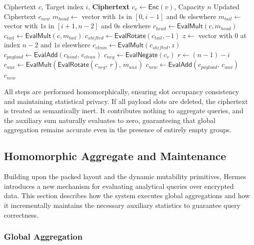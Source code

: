\documentclass[sigconf,nonacm]{acmart}
\begin{document}
\begin{algorithm}[t]
\caption{Homomorphic Deletion}
\label{alg:deletion}

\begin{algorithmic}[1]
\Require Ciphertext $c$, Target index $i$, \textbf{Ciphertext} $c_v \leftarrow \mathsf{Enc}(v)$, Capacity $n$
\Ensure Updated Ciphertext $c_{new}$
\State $m_{head} \leftarrow$ vector with $1$s in $[0, i-1]$ and $0$s elsewhere
\State $m_{tail} \leftarrow$ vector with $1$s in $[i+1, n-2]$ and $0$s elsewhere
\State $c_{head} \leftarrow \mathsf{EvalMult}(c, m_{head})$
\State $c_{tail} \leftarrow \mathsf{EvalMult}(c, m_{tail})$
\State $c_{shifted} \leftarrow \mathsf{EvalRotate}(c_{tail}, -1)$
\State $z \leftarrow$ vector with $0$ at index $n-2$ and $1$s elsewhere
\State $c_{clean} \leftarrow \mathsf{EvalMult}(c_{shifted}, z)$
\State $c_{payload} \leftarrow \mathsf{EvalAdd}(c_{head},\, c_{clean})$
\State $c_{neg} \leftarrow \mathsf{EvalNegate}(c_v)$
\State $r \leftarrow (n-1) - i$
\State $c_{aux} \leftarrow \mathsf{EvalMult}(\mathsf{EvalRotate}(c_{neg},\, r),\, m_{aux})$
\State $c_{new} \leftarrow \mathsf{EvalAdd}(c_{payload},\, c_{aux})$
\State \Return $c_{new}$
\end{algorithmic}
\end{algorithm}

All steps are performed homomorphically, ensuring slot occupancy consistency and maintaining statistical privacy. If all payload slots are deleted, the ciphertext is treated as semantically inert. It contributes nothing to aggregate queries, and the auxiliary sum naturally evaluates to zero, guaranteeing that global aggregation remains accurate even in the presence of entirely empty groups.

\subsection{Homomorphic Aggregate and Maintenance}
\label{sec:aggregation}

Building upon the packed layout and the dynamic mutability primitives, Hermes introduces a new mechanism for evaluating analytical queries over encrypted data. This section describes how the system executes global aggregations and how it incrementally maintains the necessary auxiliary statistics to guarantee query correctness.

\subsubsection{Global Aggregation}
\end{document}
